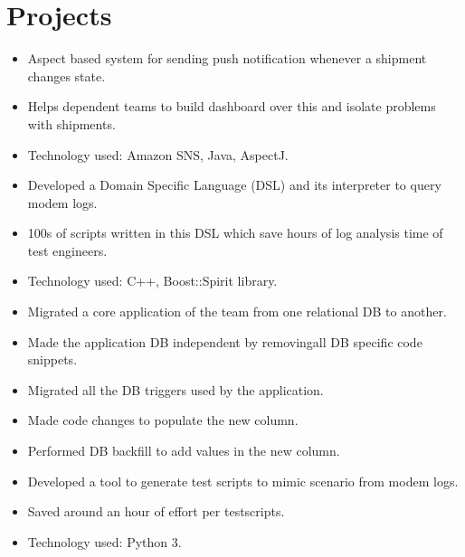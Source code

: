 \documentclass[a4paper,10pt]{simpleresume}
\begin{document}
\section{Projects}
\begin{itemize}
\item Aspect based system for sending push notification whenever a shipment changes state.
\item Helps dependent teams to build dashboard over this and isolate problems with shipments.
\item Technology used: Amazon SNS, Java, AspectJ.
\end{itemize}
\begin{itemize}
    \item Developed a Domain Specific Language (DSL) and its interpreter to query modem logs.
    \item 100s of scripts written in this DSL which save hours of log analysis time of test engineers.
    \item Technology used: C++, Boost::Spirit library.
    \end{itemize}
\begin{itemize}
    \item Migrated a core application of the team from one relational DB to another.
    \item Made the application DB independent by removingall DB specific code snippets.
    \item Migrated all the DB triggers used by the application.
\end{itemize}
\begin{itemize}
    \item Made code changes to populate the new column.
    \item Performed DB backfill to add values in the new column.
\end{itemize}
\begin{itemize}
    \item Developed a tool to generate test scripts to mimic scenario from modem logs.
    \item Saved around an hour of effort per testscripts.
    \item Technology used: Python 3.
\end{itemize}
\end{document}
